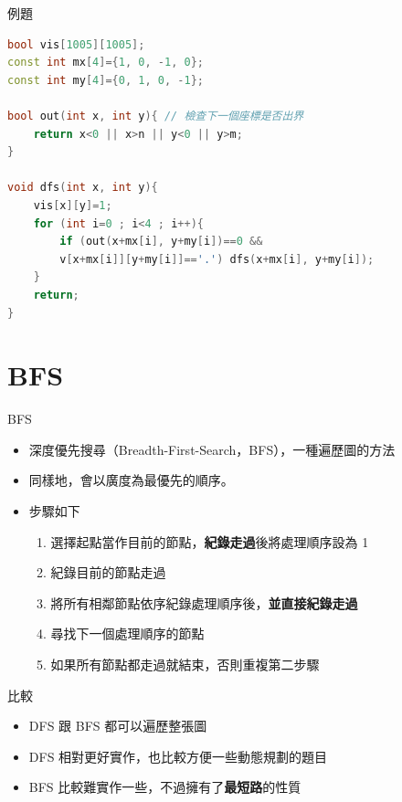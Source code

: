 \documentclass[mathserif]{beamer}
\begin{document}
\begin{frame}[fragile]{例題}
\begin{lstlisting}[language=C++, caption={}]
bool vis[1005][1005];
const int mx[4]={1, 0, -1, 0};
const int my[4]={0, 1, 0, -1};

bool out(int x, int y){ // 檢查下一個座標是否出界
    return x<0 || x>n || y<0 || y>m;
}

void dfs(int x, int y){
    vis[x][y]=1;
    for (int i=0 ; i<4 ; i++){
        if (out(x+mx[i], y+my[i])==0 &&
        v[x+mx[i]][y+my[i]]=='.') dfs(x+mx[i], y+my[i]);
    }
    return;
}
\end{lstlisting}
\end{frame}

\section{BFS}

\begin{frame}{BFS}
    \begin{itemize}
        \item 深度優先搜尋（Breadth-First-Search，BFS），一種遍歷圖的方法
        \item 同樣地，會以廣度為最優先的順序。
        \item 步驟如下
            \begin{enumerate}
                \itemsep=5pt
                \item 選擇起點當作目前的節點，\textbf{紀錄走過}後將處理順序設為 1
                \item 紀錄目前的節點走過
                \item 將所有相鄰節點依序紀錄處理順序後，\textbf{並直接紀錄走過}
                \item 尋找下一個處理順序的節點
                \item 如果所有節點都走過就結束，否則重複第二步驟
            \end{enumerate}
    \end{itemize}
\end{frame}

\begin{frame}{比較}
    \begin{itemize}
        \item DFS 跟 BFS 都可以遍歷整張圖
        \item DFS 相對更好實作，也比較方便一些動態規劃的題目
        \item BFS 比較難實作一些，不過擁有了\textbf{最短路}的性質
    \end{itemize}
\end{frame}
\end{document}
